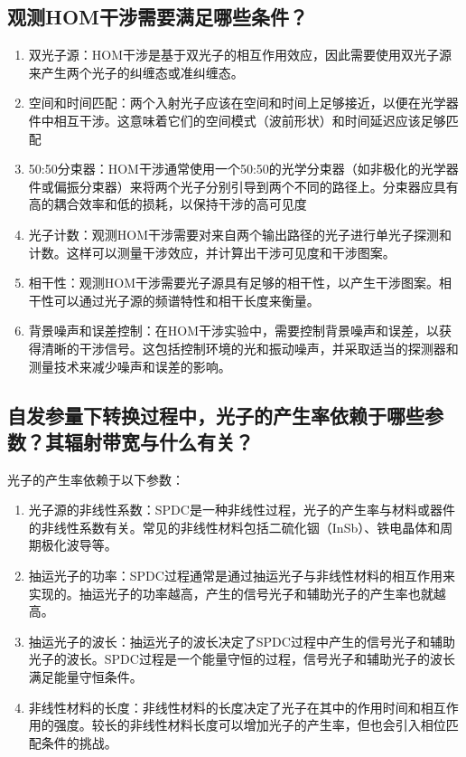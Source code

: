 \documentclass[a4paper,UTF8]{ctexart}
\begin{document}
\subsection{观测HOM干涉需要满足哪些条件？}

\begin{enumerate}
    \item 双光子源：HOM干涉是基于双光子的相互作用效应，因此需要使用双光子源来产生两个光子的纠缠态或准纠缠态。
    \item 空间和时间匹配：两个入射光子应该在空间和时间上足够接近，以便在光学器件中相互干涉。这意味着它们的空间模式（波前形状）和时间延迟应该足够匹配
    \item 50:50分束器：HOM干涉通常使用一个50:50的光学分束器（如非极化的光学器件或偏振分束器）来将两个光子分别引导到两个不同的路径上。分束器应具有高的耦合效率和低的损耗，以保持干涉的高可见度
    \item 光子计数：观测HOM干涉需要对来自两个输出路径的光子进行单光子探测和计数。这样可以测量干涉效应，并计算出干涉可见度和干涉图案。
    \item 相干性：观测HOM干涉需要光子源具有足够的相干性，以产生干涉图案。相干性可以通过光子源的频谱特性和相干长度来衡量。
    \item 背景噪声和误差控制：在HOM干涉实验中，需要控制背景噪声和误差，以获得清晰的干涉信号。这包括控制环境的光和振动噪声，并采取适当的探测器和测量技术来减少噪声和误差的影响。
\end{enumerate}

\subsection{自发参量下转换过程中，光子的产生率依赖于哪些参数？其辐射带宽与什么有关？}

光子的产生率依赖于以下参数：

\begin{enumerate}
    \item 光子源的非线性系数：SPDC是一种非线性过程，光子的产生率与材料或器件的非线性系数有关。常见的非线性材料包括二硫化铟（InSb）、铁电晶体和周期极化波导等。
    \item 抽运光子的功率：SPDC过程通常是通过抽运光子与非线性材料的相互作用来实现的。抽运光子的功率越高，产生的信号光子和辅助光子的产生率也就越高。
    \item 抽运光子的波长：抽运光子的波长决定了SPDC过程中产生的信号光子和辅助光子的波长。SPDC过程是一个能量守恒的过程，信号光子和辅助光子的波长满足能量守恒条件。
    \item 非线性材料的长度：非线性材料的长度决定了光子在其中的作用时间和相互作用的强度。较长的非线性材料长度可以增加光子的产生率，但也会引入相位匹配条件的挑战。
\end{enumerate}
\end{document}
